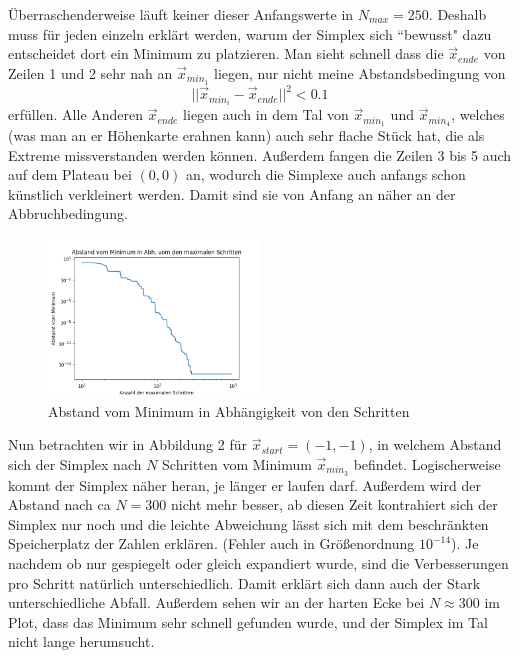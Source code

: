 \documentclass{article}
\begin{document}
	Überraschenderweise läuft keiner dieser Anfangswerte in $N_{max} = 250$. Deshalb muss für jeden einzeln erklärt werden, warum der Simplex sich ``bewusst" dazu entscheidet dort ein Minimum zu platzieren. Man sieht schnell dass die $\vec{x}_{ende}$ von Zeilen 1 und 2 sehr nah an $\vec{x}_{min_1}$ liegen, nur nicht meine Abstandsbedingung von $$||\vec{x}_{min_i}-\vec{x}_{ende}||^2 < 0.1$$ erfüllen. Alle Anderen $\vec{x}_{ende}$ liegen auch in dem Tal von $\vec{x}_{min_1}$ und $\vec{x}_{min_4}$, welches (was man an er Höhenkarte erahnen kann) auch sehr flache Stück hat, die als Extreme missverstanden werden können. Außerdem fangen die Zeilen 3 bis 5 auch auf dem Plateau bei $(0, 0)$ an, wodurch die Simplexe auch anfangs schon künstlich verkleinert werden. Damit sind sie von Anfang an näher an der Abbruchbedingung.
	
	\begin{figure}
		\centering
		\includegraphics[width=0.5\textwidth]{fig2}
		\caption{Abstand vom Minimum in Abhängigkeit von den Schritten}
	\end{figure}

	Nun betrachten wir in Abbildung 2 für $\vec{x}_{start} = (-1, -1)$, in welchem Abstand sich der Simplex nach $N$ Schritten vom Minimum $\vec{x}_{min_3}$ befindet. Logischerweise kommt der Simplex näher heran, je länger er laufen darf. Außerdem wird der Abstand nach ca $N=300$ nicht mehr besser, ab diesen Zeit kontrahiert sich der Simplex nur noch und die leichte Abweichung lässt sich mit dem beschränkten Speicherplatz der Zahlen erklären. (Fehler auch in Größenordnung $10^{-14}$). Je nachdem ob nur gespiegelt oder gleich expandiert wurde, sind die Verbesserungen pro Schritt natürlich unterschiedlich. Damit erklärt sich dann auch der Stark unterschiedliche Abfall. Außerdem sehen wir an der harten Ecke bei $N\approx300$ im Plot, dass das Minimum sehr schnell gefunden wurde, und der Simplex im Tal nicht lange herumsucht.
\end{document}
